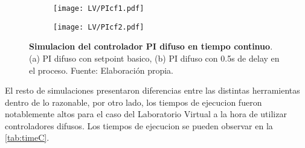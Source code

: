         \begin{figure}[htb]
            \centering
            \begin{subfigure}[t]{0.49\textwidth}
                \centering
                \texttt{[image: LV/PIcf1.pdf]}
                \caption{}
                \label{fig:PIf1}
            \end{subfigure}
            \hfill
            \begin{subfigure}[t]{0.49\textwidth}
                \centering
                \texttt{[image: LV/PIcf2.pdf]}
                \caption{}
                \label{fig:PIf2}
            \end{subfigure}
            \caption[Simulacion del controlador PI difuso en tiempo continuo]{\textbf{Simulacion del controlador PI difuso en tiempo continuo}. (a) PI difuso con setpoint basico, (b) PI difuso con 0.5s de delay en el proceso. Fuente: Elaboración propia. \label{fig:PIdifuso}}
        \end{figure}

        El resto de simulaciones presentaron diferencias entre las distintas herramientas dentro de lo razonable, por otro lado, los tiempos de ejecucion fueron notablemente altos para el caso del Laboratorio Virtual a la hora de utilizar controladores difusos. Los tiempos de ejecucion se pueden observar en la \cref{tab:timeC}.

